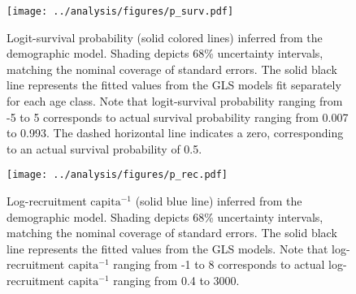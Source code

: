 \documentclass[11pt]{article}
\begin{document}
\clearpage
\begin{figure}
\centering
\texttt{[image: ../analysis/figures/p\_surv.pdf]}
\caption{\label{fig:p_surv}
Logit-survival probability (solid colored lines) inferred from the demographic model.
Shading depicts 68\% uncertainty intervals, 
matching the nominal coverage of standard errors.
The solid black line represents the fitted values from the GLS models
fit separately for each age class.
Note that logit-survival probability ranging from -5 to 5 
corresponds to actual survival probability ranging from 0.007 to 0.993.
The dashed horizontal line indicates a zero, corresponding to 
an actual survival probability of 0.5.
}
\end{figure}
\clearpage

\clearpage
\begin{figure}
\centering
\texttt{[image: ../analysis/figures/p\_rec.pdf]}
\caption{\label{fig:p_rec}
Log-recruitment $\text{capita}^{-1}$ (solid blue line) inferred from the demographic model.
Shading depicts 68\% uncertainty intervals, 
matching the nominal coverage of standard errors.
The solid black line represents the fitted values from the GLS models.
Note that log-recruitment $\text{capita}^{-1}$ ranging from -1 to 8 
corresponds to actual log-recruitment $\text{capita}^{-1}$ ranging from 0.4 to 3000.
}
\end{figure}
\clearpage
\end{document}
